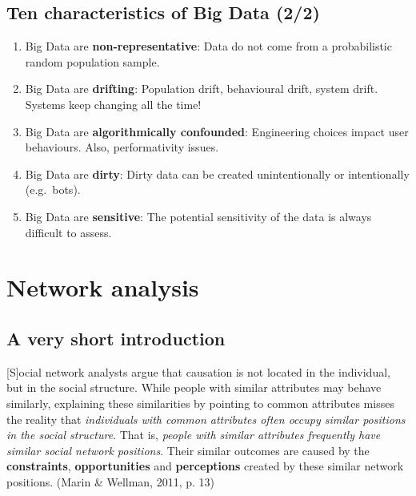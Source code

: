 \documentclass[
  letterpaper,
  DIV=11,
  numbers=noendperiod]{scrartcl}
\begin{document}
\subsection{Ten characteristics of Big Data
(2/2)}\label{ten-characteristics-of-big-data-22}

\begin{enumerate}
\def\labelenumi{\arabic{enumi}.}
\setcounter{enumi}{5}
\item
  Big Data are \textbf{non-representative}: Data do not come from a
  probabilistic random population sample.
\item
  Big Data are \textbf{drifting}: Population drift, behavioural drift,
  system drift. Systems keep changing all the time!
\item
  Big Data are \textbf{algorithmically confounded}: Engineering choices
  impact user behaviours. Also, performativity issues.
\item
  Big Data are \textbf{dirty}: Dirty data can be created unintentionally
  or intentionally (e.g.~bots).
\item
  Big Data are \textbf{sensitive}: The potential sensitivity of the data
  is always difficult to assess.
\end{enumerate}

\section{Network analysis}\label{network-analysis}

\subsection{A very short introduction}\label{a-very-short-introduction}

\begin{tcolorbox}[enhanced jigsaw, arc=.35mm, bottomrule=.15mm, bottomtitle=1mm, breakable, colback=white, colbacktitle=quarto-callout-note-color!10!white, colframe=quarto-callout-note-color-frame, coltitle=black, left=2mm, leftrule=.75mm, opacityback=0, opacitybacktitle=0.6, rightrule=.15mm, title=\textcolor{quarto-callout-note-color}{\faInfo}\hspace{0.5em}{Relations, not attributes. Networks, not groups.}, titlerule=0mm, toprule=.15mm, toptitle=1mm]

{[}S{]}ocial network analysts argue that causation is not located in the
individual, but in the social structure. While people with similar
attributes may behave similarly, explaining these similarities by
pointing to common attributes misses the reality that \emph{individuals
with common attributes often occupy similar positions in the social
structure}. That is, \emph{people with similar attributes frequently
have similar social network positions}. Their similar outcomes are
caused by the \textbf{constraints}, \textbf{opportunities} and
\textbf{perceptions} created by these similar network positions. (Marin
\& Wellman, 2011, p. 13)

\end{tcolorbox}
\end{document}
